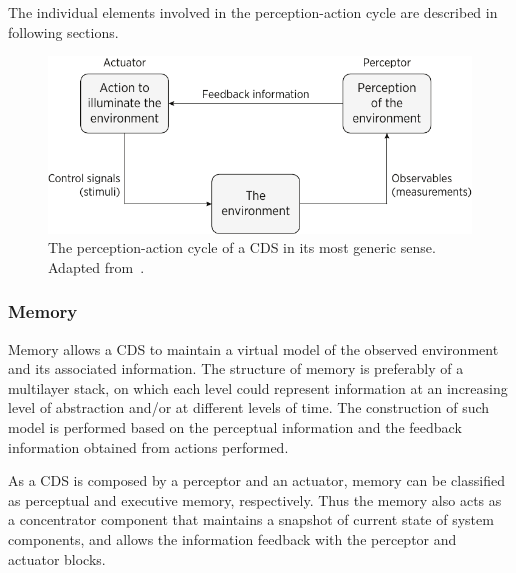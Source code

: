 \documentclass[ENG,PhD]{cinvestav}
\begin{document}
The individual elements involved in the perception-action cycle are described in following sections.

\begin{figure}
  \centering
  \includegraphics[scale=0.75]{vectors/cds-generic}
  \caption{The perception-action cycle of a CDS in its most generic sense. Adapted from~\cite{Haykin2012}.}
  \label{fig:cds-perception-action-cycle}
\end{figure}

\subsubsection*{Memory}
Memory allows a CDS to maintain a virtual model of the observed environment and its associated information.
The structure of memory is preferably of a multilayer stack, on which each level could represent information at an increasing level of abstraction and/or at different levels of time.
The construction of such model is performed based on the perceptual information and the feedback information obtained from actions performed.

As a CDS is composed by a perceptor and an actuator, memory can be classified as perceptual and executive memory, respectively.
Thus the memory also acts as a concentrator component that maintains a snapshot of current state of system components, and allows the information feedback with the perceptor and actuator blocks.
\end{document}
